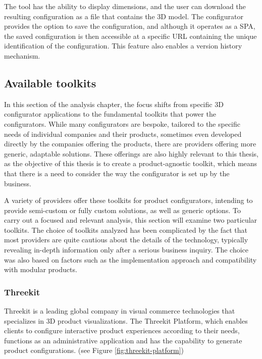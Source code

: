 The tool has the ability to display dimensions, and the user can download the resulting configuration as a file that contains the 3D model. The configurator provides the option to save the configuration, and although it operates as a SPA, the saved configuration is then accessible at a specific URL containing the unique identification of the configuration. This feature also enables a version history mechanism.

\subsection{Available toolkits}

In this section of the analysis chapter, the focus shifts from specific 3D configurator applications to the fundamental toolkits that power the configurators. While many configurators are bespoke, tailored to the specific needs of individual companies and their products, sometimes even developed directly by the companies offering the products, there are providers offering more generic, adaptable solutions. These offerings are also highly relevant to this thesis, as the objective of this thesis is to create a product-agnostic toolkit, which means that there is a need to consider the way the configurator is set up by the business.

A variety of providers offer these toolkits for product configurators, intending to provide semi-custom or fully custom solutions, as well as generic options. To carry out a focused and relevant analysis, this section will examine two particular toolkits. The choice of toolkits analyzed has been complicated by the fact that most providers are quite cautious about the details of the technology, typically revealing in-depth information only after a serious business inquiry. The choice was also based on factors such as the implementation approach and compatibility with modular products.

\subsubsection{Threekit}

Threekit is a leading global company in visual commerce technologies that specializes in 3D product visualizations. The Threekit Platform, which enables clients to configure interactive product experiences according to their needs, functions as an administrative application and has the capability to generate product configurations. (see Figure \ref{fig:threekit-platform}) \cite{ThreeKitAboutUs} \cite{ThreeKitPlatform}

